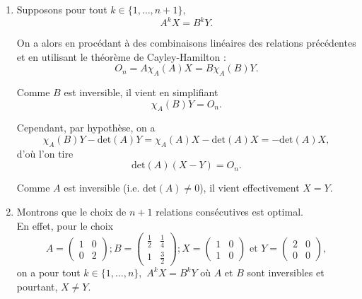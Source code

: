 \begin{enumerate}
\item Supposons pour tout $k\in\{1,\ldots,n+1\},$ $$A^{k}X=B^{k}Y.$$

On a alors en procédant à des combinaisons linéaires des relations précédentes et en utilisant le théorème de Cayley-Hamilton :  $$O_{n}=A\chi_{A}(A)X=B\chi_{A}(B)Y.$$

Comme $B$ est inversible, il vient en simplifiant $$\chi_{A}(B)Y=O_{n}.$$

Cependant, par hypothèse, on a $$\chi_{A}(B)Y-\mbox{det}(A)Y=\chi_{A}(A)X-\mbox{det}(A)X=-\mbox{det}(A)X,$$ d'où l'on tire $$\mbox{det}(A)(X-Y)=O_{n}.$$

Comme $A$ est inversible (i.e. $\mbox{det}(A)\neq 0$), il vient effectivement $\displaystyle X=Y.$

\item Montrons que le choix de $n+1$ relations consécutives est optimal.\\

En effet, pour le choix $$A= \left( \begin{array}{ll}
1 & 0\\
0 & 2
\end{array} \right); B= \left( \begin{array}{ll}
\frac{1}{2} & \frac{1}{4}\\
1 & \frac{3}{2}
\end{array}\right); X= \left( \begin{array}{ll}
1 & 0\\
1 & 0
\end{array}\right) \mbox{ et }  Y= \left( \begin{array}{ll}
2 & 0\\
0 & 0
\end{array}\right),$$ on a pour tout $k\in\{1,\ldots,n\},$ $\displaystyle A^{k}X=B^{k}Y$ où $A$ et $B$ sont inversibles et pourtant, $X\neq Y.$


\end{enumerate}